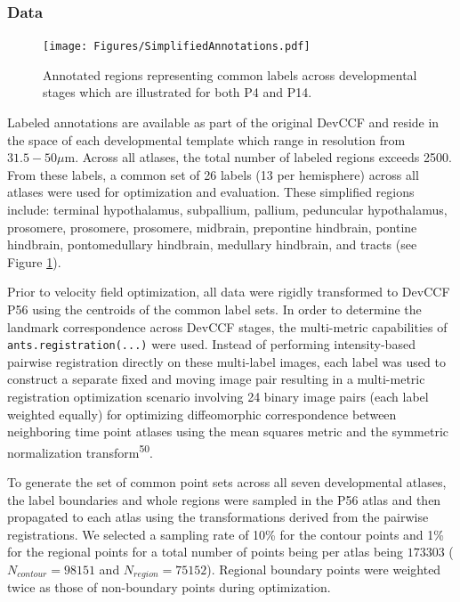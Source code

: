 \documentclass[
  12pt,
]{article}
\begin{document}
\subsubsection{Data}\label{data}

\begin{figure}[!htb]
\centering
\texttt{[image: Figures/SimplifiedAnnotations.pdf]}
\caption{Annotated regions representing common labels across developmental stages which
are illustrated for both P4 and P14.}
\label{fig:simplifiedannotations}
\end{figure}

Labeled annotations are available as part of the original DevCCF and
reside in the space of each developmental template which range in
resolution from \(31.5-50 \mu\)m. Across all atlases, the total number
of labeled regions exceeds 2500. From these labels, a common set of 26
labels (13 per hemisphere) across all atlases were used for optimization
and evaluation. These simplified regions include: terminal hypothalamus,
subpallium, pallium, peduncular hypothalamus, prosomere, prosomere,
prosomere, midbrain, prepontine hindbrain, pontine hindbrain,
pontomedullary hindbrain, medullary hindbrain, and tracts (see Figure
\ref{fig:simplifiedannotations}).

Prior to velocity field optimization, all data were rigidly transformed
to DevCCF P56 using the centroids of the common label sets. In order to
determine the landmark correspondence across DevCCF stages, the
multi-metric capabilities of \texttt{ants.registration(...)} were used.
Instead of performing intensity-based pairwise registration directly on
these multi-label images, each label was used to construct a separate
fixed and moving image pair resulting in a multi-metric registration
optimization scenario involving 24 binary image pairs (each label
weighted equally) for optimizing diffeomorphic correspondence between
neighboring time point atlases using the mean squares metric and the
symmetric normalization transform\textsuperscript{50}.

To generate the set of common point sets across all seven developmental
atlases, the label boundaries and whole regions were sampled in the P56
atlas and then propagated to each atlas using the transformations
derived from the pairwise registrations. We selected a sampling rate of
10\% for the contour points and 1\% for the regional points for a total
number of points being per atlas being \(173303\)
(\(N_{contour} = 98151\) and \(N_{region}=75152\)). Regional boundary
points were weighted twice as those of non-boundary points during
optimization.
\end{document}
